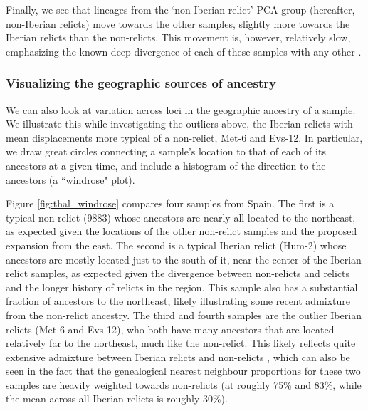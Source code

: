 \documentclass[12pt]{article}
\begin{document}
Finally, we see that lineages from the `non-Iberian relict' PCA group (hereafter, non-Iberian relicts) move towards the other samples, slightly more towards the Iberian relicts than the non-relicts. This movement is, however, relatively slow, emphasizing the known deep divergence of each of these samples with any other \citep{alonso2016,fulgione2018madeiran,fulgione2018archaic,fulgione2022parallel}.

\subsubsection*{Visualizing the geographic sources of ancestry}

We can also look at variation across loci in the geographic ancestry of a sample. We illustrate this while investigating the outliers above, the Iberian relicts with mean displacements more typical of a non-relict, Met-6 and Evs-12. In particular, we draw great circles connecting a sample's location to that of each of its ancestors at a given time, and include a histogram of the direction to the ancestors (a ``windrose" plot). 

Figure \ref{fig:thal_windrose} compares four samples from Spain. The first is a typical non-relict (9883) whose ancestors are nearly all located to the northeast, as expected given the locations of the other non-relict samples and the proposed expansion from the east. The second is a typical Iberian relict (Hum-2) whose ancestors are mostly located just to the south of it, near the center of the Iberian relict samples, as expected given the divergence between non-relicts and relicts and the longer history of relicts in the region. This sample also has a substantial fraction of ancestors to the northeast, likely illustrating some recent admixture from the non-relict ancestry. The third and fourth samples are the outlier Iberian relicts (Met-6 and Evs-12), who both have many ancestors that are located relatively far to the northeast, much like the non-relict. This likely reflects quite extensive admixture between Iberian relicts and non-relicts \citep{alonso2016,fulgione2018archaic}, which can also be seen in the fact that the genealogical nearest neighbour proportions \citep{kelleher2019inferring} for these two samples are heavily weighted towards non-relicts (at roughly 75\% and 83\%, while the mean across all Iberian relicts is roughly 30\%).
\end{document}

